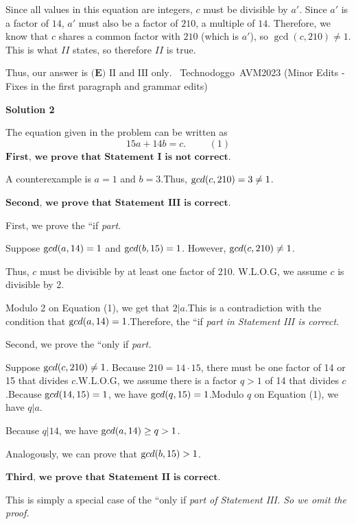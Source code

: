 \begin{enumerate}
 Since all values in this equation are integers, $c$ must be divisible by $a'$. Since $a'$ is a factor of $14$, $a'$ must also be a factor of $210$, a multiple of $14$. Therefore, we know that $c$ shares a common factor with $210$ (which is $a'$), so $\gcd(c,210)\neq1$. This is what $II$ states, so therefore $II$ is true. 

 Thus, our answer is $\boxed{\textbf{(E) }\text{II and III only}}.$ ~Technodoggo~AVM2023 (Minor Edits - Fixes in the first paragraph and grammar edits)

 



\textbf{Solution 2}

The equation given in the problem can be written as
 \[ 15 a + 14 b = c. \hspace{1cm} (1) \]
$\textbf{First, we prove that Statement I is not correct.}$

 A counterexample is $a = 1$ and $b = 3$.Thus, ${\textrm gcd} (c, 210) = 3 \neq 1$.

 $\textbf{Second, we prove that Statement III is correct.}$

 First, we prove the ``if\textit{ part. }

 Suppose ${\textrm gcd}(a , 14) = 1$ and ${\textrm gcd}(b, 15) = 1$. However, ${\textrm gcd} (c, 210) \neq 1$.

 Thus, $c$ must be divisible by at least one factor of 210. W.L.O.G, we assume $c$ is divisible by 2.

 Modulo 2 on Equation (1), we get that $2 | a$.This is a contradiction with the condition that ${\textrm gcd}(a , 14) = 1$.Therefore, the ``if\textit{ part in Statement III is correct.}

 Second, we prove the ``only if\textit{ part.}

 Suppose ${\textrm gcd} (c, 210) \neq 1$. Because $210 = 14 \cdot 15$, there must be one factor of 14 or 15 that divides $c$.W.L.O.G, we assume there is a factor $q > 1$ of 14 that divides $c$.Because ${\textrm gcd} (14, 15) = 1$, we have ${\textrm gcd} (q, 15) = 1$.Modulo $q$ on Equation (1), we have $q | a$.

 Because $q | 14$, we have ${\textrm gcd}(a , 14) \geq q > 1$.

 Analogously, we can prove that ${\textrm gcd}(b , 15) > 1$.

 $\textbf{Third, we prove that Statement II is correct.}$

 This is simply a special case of the ``only if\textit{ part of Statement III. So we omit the proof.}


\end{enumerate}
